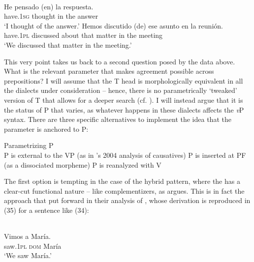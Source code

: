 \documentclass[output=paper]{langsci/langscibook}
\begin{document}
\ea%
    \label{ex:gallego:32}\\
    \ea
    \gll He             pensado (en) la     respuesta.        \\
         have{}.\textsc{1sg}  thought    in   the   answer\\
    \glt ‘I thought of the answer.’
    \ex
    \gll Hemos      discutido  (de)     ese  asunto  en  la   reunión.  \\
         have{}.\textsc{1pl}  discussed  about  that  matter  in  the meeting\\
    \glt ‘We discussed that matter in the meeting.’
    \z
\z

This very point takes us back to a second question posed by the data above. What is the relevant parameter that makes agreement possible across prepositions? I will assume that the T head is morphologically equivalent in all the  dialects under consideration – hence, there is no parametrically ‘tweaked’ version of T that allows for a deeper search (cf. \citealt{Chomsky2001Derivation}). I will instead argue that it is the status of P that varies, as whatever happens in these dialects affects the \textit{v}P syntax. There are three specific alternatives to implement the idea that the parameter is anchored to P:

\ea%
    Parametrizing P\label{ex:gallego:33}\\
    \ea P is external to the VP (as in \citeauthor{Kayne2004}'s 2004 analysis of causatives)
    \ex P is inserted at PF (as a dissociated morpheme)
    \ex P is reanalyzed with V
\z
\z

The first option is tempting in the case of the hybrid pattern, where the  has a clear-cut functional nature – like complementizers, as \citet{Kayne2004} argues. This is in fact the approach that \citet{Ordóñez2016} put forward in their analysis of \DOM, whose derivation is reproduced in (35) for a sentence like (34):

\ea%
    \label{ex:gallego:34}\\
    \gll   Vimos     a          María.\\
           saw{}.\textsc{1pl}  \textsc{dom}   María\\
    \glt   ‘We saw María.’
\z
  
\end{document}
